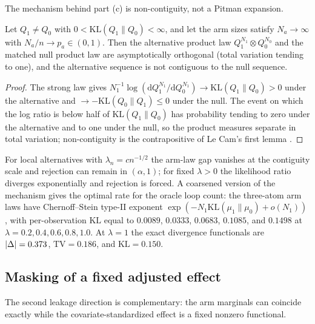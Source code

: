 The mechanism behind part (c) is non-contiguity, not a Pitman expansion.

\begin{lemma}
\label{lem:noncontiguity}
Let $Q_1\ne Q_0$ with $0<\mathrm{KL}(Q_1\|Q_0)<\infty$, and let the arm sizes satisfy $N_a\to\infty$ with $N_a/n\to p_a\in(0,1)$. Then the alternative product law $Q_1^{N_1}\otimes Q_0^{N_0}$ and the matched null product law are asymptotically orthogonal (total variation tending to one), and the alternative sequence is not contiguous to the null sequence.
\end{lemma}

\begin{proof}
The strong law gives $N_1^{-1}\log(\mathrm dQ_1^{N_1}/\mathrm dQ_0^{N_1})\to\mathrm{KL}(Q_1\|Q_0)>0$ under the alternative and $\to-\mathrm{KL}(Q_0\|Q_1)\le0$ under the null. The event on which the log ratio is below half of $\mathrm{KL}(Q_1\|Q_0)$ has probability tending to zero under the alternative and to one under the null, so the product measures separate in total variation; non-contiguity is the contrapositive of Le Cam's first lemma \citep{le_cam_1986}.
\end{proof}

For local alternatives with $\lambda_n=cn^{-1/2}$ the arm-law gap vanishes at the contiguity scale and rejection can remain in $(\alpha,1)$; for fixed $\lambda>0$ the likelihood ratio diverges exponentially and rejection is forced. A coarsened version of the mechanism gives the optimal rate for the oracle loop count: the three-atom arm laws have Chernoff--Stein type-II exponent $\exp(-N_1\mathrm{KL}(\mu_1\|\mu_0)+o(N_1))$ \citep{chernoff_1952}, with per-observation $\mathrm{KL}$ equal to $0.0089$, $0.0333$, $0.0683$, $0.1085$, and $0.1498$ at $\lambda=0.2,0.4,0.6,0.8,1.0$. At $\lambda=1$ the exact divergence functionals are $\lvert \Delta\rvert=0.373$, $\mathrm{TV}=0.186$, and $\mathrm{KL}=0.150$.

\subsection{Masking of a fixed adjusted effect}
\label{sec:masking}

The second leakage direction is complementary: the arm marginals can coincide exactly while the covariate-standardized effect is a fixed nonzero functional.


